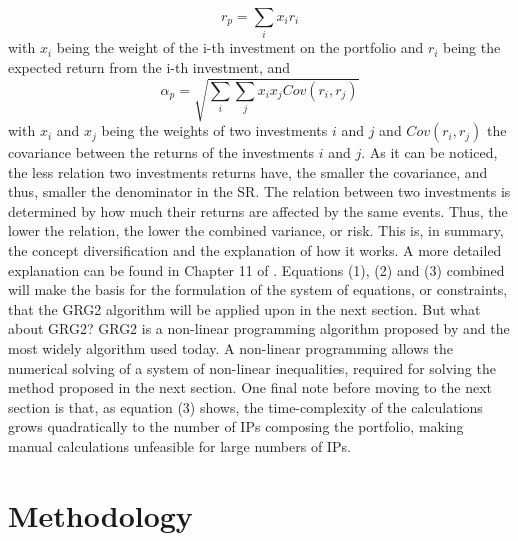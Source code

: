 \documentclass[a4paper,man,natbib]{apa6}
\begin{document}
	\begin{equation}
	r_p = \sum_i x_ir_i
	\end{equation}
	with $x_i$ being the weight of the i-th investment on the portfolio and $r_i$ being the expected return from the i-th investment, and
	\begin{equation}
	\alpha_p = \sqrt{\sum_i\sum_j x_ix_jCov(r_i,r_j)}
	\end{equation}	
	with $x_i$ and $x_j$ being the weights of two investments $i$ and $j$ and $Cov(r_i,r_j)$ the covariance between the returns of the investments $i$ and $j$. As it can be noticed, the less relation two investments returns have, the smaller the covariance, and thus, smaller the denominator in the SR. The relation between two investments is determined by how much their returns are affected by the same events. Thus, the lower the relation, the lower the combined variance, or risk. This is, in summary, the concept diversification and the explanation of how it works. A more detailed explanation can be found in Chapter 11 of \cite{berk2014corporate}.
	Equations (1), (2) and (3) combined will make the basis for the formulation of the system of equations, or constraints, that the GRG2 algorithm will be applied upon in the next section. 
	But what about GRG2? GRG2 is a non-linear programming algorithm proposed by \cite{lasdon_fox_ratner_1974} and the most widely algorithm used today. A non-linear programming allows the numerical solving of a system of non-linear inequalities, required for solving the method proposed in the next section.  
	One final note before moving to the next section is that, as equation (3) shows, the time-complexity of the calculations grows quadratically to the number of IPs composing the portfolio, making manual calculations unfeasible for large numbers of IPs.
	\clearpage

	\section{Methodology}
\end{document}
